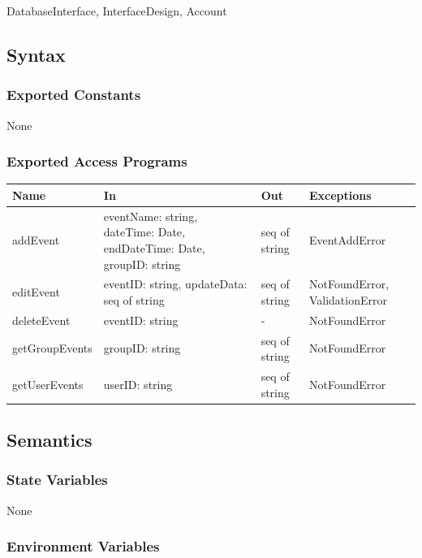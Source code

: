 \documentclass[12pt, titlepage]{article}
\begin{document}
DatabaseInterface, InterfaceDesign, Account

\subsection{Syntax}

\subsubsection{Exported Constants}

None

\subsubsection{Exported Access Programs}

\begin{center}
\begin{tabular}{p{3cm} p{4cm} p{4cm} p{4.5cm}}
\hline
\textbf{Name} & \textbf{In} & \textbf{Out} & \textbf{Exceptions} \\
\hline
addEvent & eventName: string, dateTime: Date, endDateTime: Date, groupID: string & seq of string & EventAddError \\
\hline
editEvent & eventID: string, updateData: seq of string & seq of string & NotFoundError,  ValidationError \\
\hline
deleteEvent & eventID: string & - & NotFoundError\\
\hline
getGroupEvents & groupID: string & seq of string & NotFoundError\\
\hline
getUserEvents & userID: string & seq of string & NotFoundError\\
\hline
\end{tabular}
\end{center}

\subsection{Semantics}

\subsubsection{State Variables}

None


\subsubsection{Environment Variables}
\end{document}
